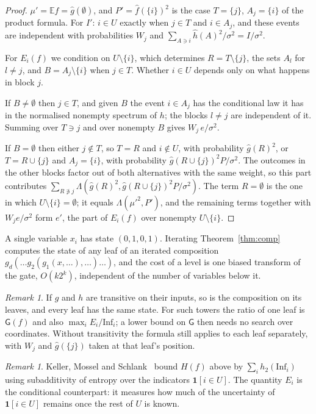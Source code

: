 \documentclass[11pt]{amsart}
\theoremstyle{definition}
\theoremstyle{remark}
\newtheorem{remark}[theorem]{Remark}
\newcommand{\Inf}{\mathrm{Inf}}
\newcommand{\E}{\mathbb{E}}
\newcommand{\G}{\mathsf{G}}
\begin{document}
\begin{proof}
$\mu'=\E f=\hat g(\emptyset)$, and $P'=\hat f(\{i\})^2$ is the case $T=\{j\}$, $A_j=\{i\}$ of the product formula.
For $I'$: $i\in U$ exactly when $j\in T$ and $i\in A_j$, and these events are independent with probabilities $W_j$
and $\sum_{A\ni i}\hat h(A)^2/\sigma^2=I/\sigma^2$.

For $E_i(f)$ we condition on $U\setminus\{i\}$, which determines $R=T\setminus\{j\}$, the sets $A_l$ for $l\ne j$,
and $B=A_j\setminus\{i\}$ when $j\in T$. Whether $i\in U$ depends only on what happens in block $j$.

If $B\ne\emptyset$ then $j\in T$, and given $B$ the event $i\in A_j$ has the conditional law it has in the
normalised nonempty spectrum of $h$; the blocks $l\ne j$ are independent of it. Summing over $T\ni j$ and over
nonempty $B$ gives $W_j\,e/\sigma^2$.

If $B=\emptyset$ then either $j\notin T$, so $T=R$ and $i\notin U$, with probability $\hat g(R)^2$, or $T=R\cup\{j\}$
and $A_j=\{i\}$, with probability $\hat g(R\cup\{j\})^2P/\sigma^2$. The outcomes in the other blocks factor out of
both alternatives with the same weight, so this part contributes
$\sum_{R\not\ni j}\Lambda(\hat g(R)^2,\hat g(R\cup\{j\})^2P/\sigma^2)$. The term $R=\emptyset$ is the one in which
$U\setminus\{i\}=\emptyset$; it equals $\Lambda(\mu'^2,P')$, and the remaining terms together with $W_je/\sigma^2$ form
$e'$, the part of $E_i(f)$ over nonempty $U\setminus\{i\}$.
\end{proof}

A single variable $x_i$ has state $(0,1,0,1)$. Iterating Theorem~\ref{thm:comp} computes the state of any leaf of an
iterated composition $g_d(\dots g_2(g_1(x,\dots),\dots)\dots)$, and the cost of a level is one biased transform of
the gate, $O(k2^k)$, independent of the number of variables below it.

\begin{remark}
If $g$ and $h$ are transitive on their inputs, so is the composition on its leaves, and every leaf has the same state. For such
towers the ratio of one leaf is $\G(f)$ and also $\max_iE_i/\Inf_i$; a lower bound on $\G$ then needs no search over
coordinates. Without transitivity the formula still applies to each leaf separately, with $W_j$ and $\hat g(\{j\})$
taken at that leaf's position.
\end{remark}

\begin{remark}
Keller, Mossel and Schlank~\cite[Claim~4.1]{KMS} bound $H(f)$ above by $\sum_i h_2(\Inf_i)$ using subadditivity of
entropy over the indicators $\mathbf 1[i\in U]$. The quantity $E_i$ is the conditional counterpart: it measures how
much of the uncertainty of $\mathbf 1[i\in U]$ remains once the rest of $U$ is known.
\end{remark}
\end{document}
